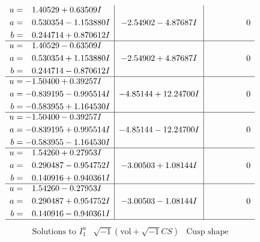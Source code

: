 \documentclass[1p]{elsarticle_modified}
\theoremstyle{definition}
\newcommand{\I}{\sqrt{-1}}
\begin{document}
$$\begin{array}{c|c|c}
\begin{aligned}
u &= \phantom{-}1.40529 + 0.63509 I \\
a &= \phantom{-}0.530354 - 1.153880 I \\
b &= \phantom{-}0.244714 + 0.870612 I\end{aligned}
 & -2.54902 - 4.87687 I & \phantom{-0.000000 } 0 \\ \hline\begin{aligned}
u &= \phantom{-}1.40529 - 0.63509 I \\
a &= \phantom{-}0.530354 + 1.153880 I \\
b &= \phantom{-}0.244714 - 0.870612 I\end{aligned}
 & -2.54902 + 4.87687 I & \phantom{-0.000000 } 0 \\ \hline\begin{aligned}
u &= -1.50400 + 0.39257 I \\
a &= -0.839195 - 0.995514 I \\
b &= -0.583955 + 1.164530 I\end{aligned}
 & -4.85144 + 12.24700 I & \phantom{-0.000000 } 0 \\ \hline\begin{aligned}
u &= -1.50400 - 0.39257 I \\
a &= -0.839195 + 0.995514 I \\
b &= -0.583955 - 1.164530 I\end{aligned}
 & -4.85144 - 12.24700 I & \phantom{-0.000000 } 0 \\ \hline\begin{aligned}
u &= \phantom{-}1.54260 + 0.27953 I \\
a &= \phantom{-}0.290487 - 0.954752 I \\
b &= \phantom{-}0.140916 + 0.940361 I\end{aligned}
 & -3.00503 + 1.08144 I & \phantom{-0.000000 } 0 \\ \hline\begin{aligned}
u &= \phantom{-}1.54260 - 0.27953 I \\
a &= \phantom{-}0.290487 + 0.954752 I \\
b &= \phantom{-}0.140916 - 0.940361 I\end{aligned}
 & -3.00503 - 1.08144 I & \phantom{-0.000000 } 0\\
 \hline 
 \end{array}$$\newpage$$\begin{array}{c|c|c}  
\text{Solutions to }I^u_{1}& \I (\text{vol} + \sqrt{-1}CS) & \text{Cusp shape}\\
 \hline 
\begin{aligned}

\end{aligned}
\end{array}$$
\end{document}
